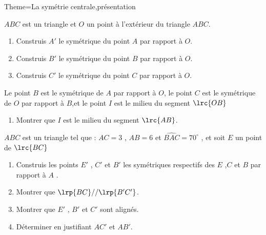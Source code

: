 \documentclass[a4paper,12pt]{article}
\begin{document}
\begin{Maquette}[Fiche]{Theme=La symétrie centrale,présentation}

\begin{exercice}%
$ABC$ est un triangle et $O$ un point à l'extérieur du triangle $ABC$.
\begin{enumerate}
\item Construis $A'$ le symétrique du point $A$ par rapport à $O$.
\item Construis $B'$ le symétrique du point $B$ par rapport à $O$.
\item Construis $C'$ le symétrique du point $C$ par rapport à $O$.
\end{enumerate}
\end{exercice}

\begin{exercice}%
Le point $B$ est le symétrique de $A$ par rapport à $O$, le point $C$ est le symétrique de $O$ par rapport à $B$,et le point $I$ est le milieu du segment $\lrc{OB}$
\begin{enumerate}
\item Montrer que $I$ est le milieu du segment $\lrc{AB}$.
\end{enumerate}
\end{exercice}

\begin{exercice}%
$ABC$ est un triangle tel que : $AC=3$ , $AB=6$ et $\widehat{BAC}=70^{\circ}$ , et soit $E$ un point de $\lrc{BC}$
\begin{enumerate}
\item Construis les points $E'$ , $C'$ et $B'$ les symétriques respectifs des $E$ ,$C$ et $B$ par rapport à $A$ .
\item Montrer que $\lrp{BC}// \lrp{B'C'}$.
\item Montrer que $E'$ , $B'$ et $C'$ sont alignés.
\item Déterminer en justifiant $AC'$ et $AB'$.
\end{enumerate}
\end{exercice}


\end{Maquette}
\end{document}
